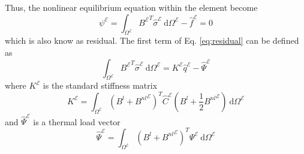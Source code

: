 \documentclass[12pt]{article}
\numberwithin{equation}{section}
\def\el{{ \mathcal{E} }}
\begin{document}
Thus, the nonlinear equilibrium equation within the element become
\begin{equation}
    \psi^\el =
    \int_{\Omega^\el} {B^\el}^T \hat{\sigma}^\el ~ \text{d}\Omega^\el -
    \hat{f}^\el = 0
    \label{eq:residual}
\end{equation}
% 
which is also know as residual. The first term of Eq. \eqref{eq:residual} can be defined as
% 
\begin{equation}
    \int_{\Omega^\el} {B^\el}^T \hat{\sigma}^\el ~ \text{d}\Omega^\el =
    K^\el \hat{q}^\el - \hat{\Psi}^\el
\end{equation}
%
where \(K^\el\) is the standard stiffness matrix
% 
\begin{equation}
    K^\el = \int_{\Omega^\el}
    \left( B^l + {B^{nl}}^\el \right)^T \hat{C}^\el \left( B^l + \frac{1}{2} {B^{nl}}^\el \right)
    ~ \text{d}\Omega^\el
\end{equation}
% 
and \( \hat{\Psi}^\el \) is a thermal load vector
% 
\begin{equation}
    \hat{\Psi}^\el = \int_{\Omega^\el} \left( B^l + {B^{nl}}^\el \right)^T \Psi^\el
    ~ \text{d}\Omega^\el
\end{equation}
\end{document}
